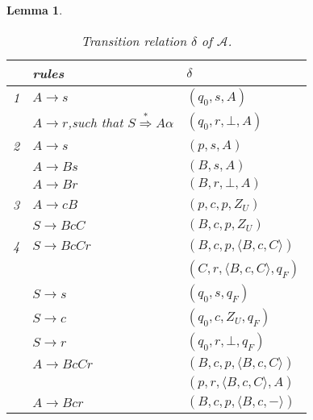 \documentclass[3p,11pt]{elsarticle}
\newtheorem{lemma}[theorem]{Lemma}
\newenvironment{proof}[1][Proof]{\begin{trivlist}
\item[\hskip \labelsep {\bfseries #1}]}{\end{trivlist}}
\begin{document}
\begin{lemma}
\begin{proof}
\begin{table}[h!]
\caption{\label{tableVPAMoves} Transition relation $\delta$ of $\mathcal{A}$.}
\renewcommand{\arraystretch}{1.3}
\begin{center}
\begin{tabular}{|l|p{4cm}|p{5cm}|}  \hline
  & rules  & $\delta$  \\
  \hline
 1&$A\to  s$ & $(q_0, s, A)$
 \\
  &$A\to  r$,\quad such that $S\stackrel{\ast}{\Rightarrow} A \alpha$  & $(q_0, r, \bot, A)$
  \\
  \hline
 2& $A\to s$ & $(p, s, A)$
 \\
 &  $A\to B s$ & $(B, s, A)$
 \\
 & $A\to  B r$ & $(B, r, \bot, A)$
  \\
  \hline
 3& $A\to c B$ & $(p, c, p, Z_U)$
  \\
 & $S\to B c C$ & $(B, c,p, Z_U)$
  \\
  \hline
 4& $S\to B c C r$ & $(B, c,p, \langle B,c,C \rangle )$
  \\
                 && $(C, r, \langle B,c,C \rangle, q_F)$
 \\
 & $S\to s$ & $(q_0, s,q_F)$
  \\
  & $S\to c$ & $(q_0, c,Z_U, q_F)$
  \\
 & $S\to r$ & $(q_0, r,\bot, q_F)$
  \\
  &$A\to B c C r$ & $(B, c, p, \langle B,c,C \rangle )$
  \\
                  && $(p, r, \langle B,c,C \rangle, A)$
  \\
  &$A\to B c  r$ & $(B, c, p, \langle B,c,- \rangle )$
  \\


\end{tabular}
\end{center}
\end{table}
\end{proof}
\end{lemma}
\end{document}
